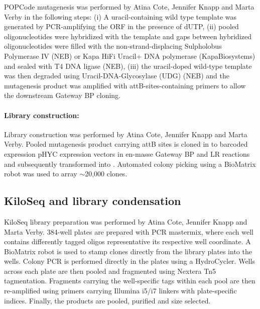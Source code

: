 POPCode mutagenesis was performed by Atina Cote, Jennifer Knapp and Marta Verby in the following steps: (i) A uracil-containing wild type template was generated by PCR-amplifying the ORF in the presence of dUTP, (ii) pooled oligonucleotides were hybridized with the template and gaps between hybridized oligonucleotides were filled with the non-strand-displacing Sulpholobus Polymerase IV (NEB) or Kapa HiFi Uracil+ DNA polymerase (KapaBiosystems) and sealed with T4 DNA ligase (NEB), (iii) the uracil-doped wild-type template was then degraded using Uracil-DNA-Glycosylase (UDG) (NEB) and the mutagenesis product was amplified with attB-sites-containing primers to allow the downstream Gateway BP cloning.

\paragraph{Library construction:} Library construction was performed by Atina Cote, Jennifer Knapp and Marta Verby. Pooled mutagenesis product carrying attB sites is cloned in to barcoded expression pHYC expression vectors in en-masse Gateway BP and LR reactions and subsequently transformed into . Automated colony picking using a BioMatrix robot was used to array $\sim$20,000 clones.

\subsection{KiloSeq and library condensation}

KiloSeq library preparation was performed by Atina Cote, Jennifer Knapp and Marta Verby. 384-well plates are prepared with PCR mastermix, where each well contains differently tagged oligos representative its respective well coordinate. A BioMatrix robot is used to stamp clones directly from the library plates into the wells. Colony PCR is performed directly in the plates using a HydroCycler. Wells across each plate are then pooled and fragmented using Nextera Tn5 tagmentation. Fragments carrying the well-specific tags within each pool are then re-amplified using primers carrying Illumina i5/i7 linkers with plate-specific indices. Finally, the products are pooled, purified and size selected.


